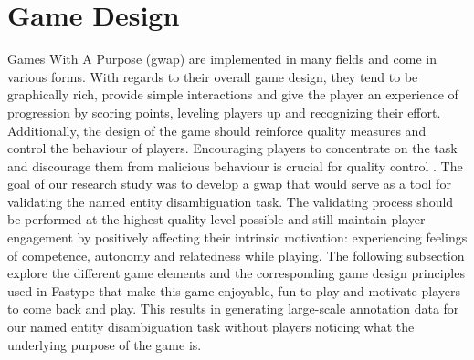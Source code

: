 \section{Game Design}
\label{game:design}
Games With A Purpose (\ac{gwap}) are implemented in many fields and come in various forms. With regards to their overall game design, they tend to be graphically rich, provide simple interactions and give the player an experience of progression by scoring points, leveling players up and recognizing their effort. Additionally, the design of the game should reinforce quality measures and control the behaviour of players. Encouraging players to concentrate on the task and discourage them from malicious behaviour is crucial for quality control \cite{42}. The goal of our research study was to develop a \ac{gwap} that would serve as a tool for validating the named entity disambiguation task. The validating process should be performed at the highest quality level possible and still maintain player engagement by positively affecting their intrinsic motivation: experiencing feelings of competence, autonomy and relatedness while playing. The following subsection explore the different game elements and the corresponding game design principles used in Fastype that make this game enjoyable, fun to play and motivate players to come back and play. This results in generating large-scale annotation data for our named entity disambiguation task without players noticing what the underlying purpose of the game is.







